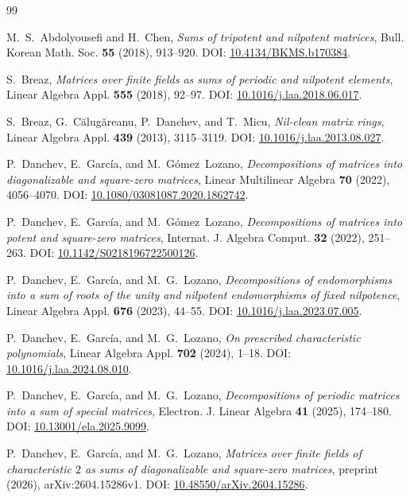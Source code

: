 \documentclass[12pt]{amsart}
\theoremstyle{remark}
\numberwithin{equation}{section}
\theoremstyle{definition}
\begin{document}
\begin{thebibliography}{99}

M.~S.~Abdolyousefi and H.~Chen, \emph{Sums of tripotent and nilpotent matrices}, Bull. Korean Math. Soc. \textbf{55} (2018), 913--920.
DOI: \href{https://doi.org/10.4134/BKMS.b170384}{10.4134/BKMS.b170384}.

S.~Breaz, \emph{Matrices over finite fields as sums of periodic and nilpotent elements}, Linear Algebra Appl. \textbf{555} (2018), 92--97.
DOI: \href{https://doi.org/10.1016/j.laa.2018.06.017}{10.1016/j.laa.2018.06.017}.

S.~Breaz, G.~C\u{a}lug\u{a}reanu, P.~Danchev, and T.~Micu, \emph{Nil-clean matrix rings}, Linear Algebra Appl. \textbf{439} (2013), 3115--3119.
DOI: \href{https://doi.org/10.1016/j.laa.2013.08.027}{10.1016/j.laa.2013.08.027}.

P.~Danchev, E.~Garc\'ia, and M.~G\'omez~Lozano, \emph{Decompositions of matrices into diagonalizable and square-zero matrices}, Linear Multilinear Algebra \textbf{70} (2022), 4056--4070.
DOI: \href{https://doi.org/10.1080/03081087.2020.1862742}{10.1080/03081087.2020.1862742}.

P.~Danchev, E.~Garc\'ia, and M.~G\'omez~Lozano, \emph{Decompositions of matrices into potent and square-zero matrices}, Internat. J. Algebra Comput. \textbf{32} (2022), 251--263.
DOI: \href{https://doi.org/10.1142/S0218196722500126}{10.1142/S0218196722500126}.

P.~Danchev, E.~Garc\'ia, and M.~G.~Lozano, \emph{Decompositions of endomorphisms into a sum of roots of the unity and nilpotent endomorphisms of fixed nilpotence}, Linear Algebra Appl. \textbf{676} (2023), 44--55.
DOI: \href{https://doi.org/10.1016/j.laa.2023.07.005}{10.1016/j.laa.2023.07.005}.

P.~Danchev, E.~Garc\'ia, and M.~G.~Lozano, \emph{On prescribed characteristic polynomials}, Linear Algebra Appl. \textbf{702} (2024), 1--18.
DOI: \href{https://doi.org/10.1016/j.laa.2024.08.010}{10.1016/j.laa.2024.08.010}.

P.~Danchev, E.~Garc\'ia, and M.~G.~Lozano, \emph{Decompositions of periodic matrices into a sum of special matrices}, Electron. J. Linear Algebra \textbf{41} (2025), 174--180.
DOI: \href{https://doi.org/10.13001/ela.2025.9099}{10.13001/ela.2025.9099}.

P.~Danchev, E.~Garc\'ia, and M.~G.~Lozano, \emph{Matrices over finite fields of characteristic $2$ as sums of diagonalizable and square-zero matrices}, preprint (2026), arXiv:2604.15286v1.
DOI: \href{https://doi.org/10.48550/arXiv.2604.15286}{10.48550/arXiv.2604.15286}.


\end{thebibliography}
\end{document}
